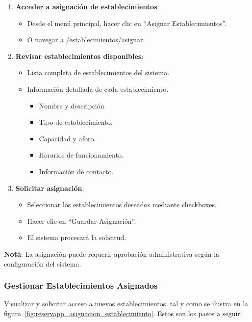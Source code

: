 \begin{enumerate}
   \item \textbf{Acceder a asignación de establecimientos}:
   \begin{itemize}
      \item Desde el menú principal, hacer clic en ``Asignar Establecimientos''.
      \item O navegar a /establecimientos/asignar.
   \end{itemize}
   \item \textbf{Revisar establecimientos disponibles}:
   \begin{itemize}
      \item Lista completa de establecimientos del sistema.
      \item Información detallada de cada establecimiento.
	  \begin{itemize}
         \item Nombre y descripción.
         \item Tipo de establecimiento.
		 \item Capacidad y aforo.
		 \item Horarios de funcionamiento.
		 \item Información de contacto.
      \end{itemize}
   \end{itemize}
   \item \textbf{Solicitar asignación}:
   \begin{itemize}
      \item Seleccionar los establecimientos deseados mediante checkboxes.
      \item Hacer clic en ``Guardar Asignación''.
      \item El sistema procesará la solicitud.
   \end{itemize}
\end{enumerate}

\textbf{Nota}: La asignación puede requerir aprobación administrativa según la configuración del sistema.


\subsubsection{Gestionar Establecimientos Asignados}
Visualizar y solicitar acceso a nuevos establecimientos, tal y como se ilustra en la figura~\ref{fig:reservapp_asignacion_establecimiento}. Estos son los pasos a seguir:

